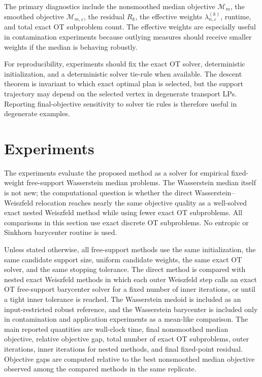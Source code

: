 \documentclass[pdflatex,sn-mathphys-ay]{sn-jnl}%
\theoremstyle{thmstyleone}%
\theoremstyle{thmstyletwo}%
\theoremstyle{thmstylethree}%
\newcommand{\calM}{\mathcal M}
\newcommand{\eps}{\varepsilon}
\begin{document}
The primary diagnostics include the nonsmoothed median objective \(\calM_m\), the smoothed objective \(\calM_{m,\eps}\), the residual \(R_k\), the effective weights \(\lambda_{n,\eps}^{(k)}\), runtime, and total exact OT subproblem count. The effective weights are especially useful in contamination experiments because outlying measures should receive smaller weights if the median is behaving robustly.

For reproducibility, experiments should fix the exact OT solver, deterministic initialization, and a deterministic solver tie-rule when available. The descent theorem is invariant to which exact optimal plan is selected, but the support trajectory may depend on the selected vertex in degenerate transport LPs. Reporting final-objective sensitivity to solver tie rules is therefore useful in degenerate examples.



\section{Experiments}\label{sec:experiments}

The experiments evaluate the proposed method as a solver for empirical fixed-weight free-support Wasserstein median problems. The Wasserstein median itself is not new; the computational question is whether the direct Wasserstein--Weiszfeld relocation reaches nearly the same objective quality as a well-solved exact nested Weiszfeld method while using fewer exact OT subproblems. All comparisons in this section use exact discrete OT subproblems. No entropic or Sinkhorn barycenter routine is used.

Unless stated otherwise, all free-support methods use the same initialization, the same candidate support size, uniform candidate weights, the same exact OT solver, and the same stopping tolerance. The direct method is compared with nested exact Weiszfeld methods in which each outer Weiszfeld step calls an exact OT free-support barycenter solver for a fixed number of inner iterations, or until a tight inner tolerance is reached. The Wasserstein medoid is included as an input-restricted robust reference, and the Wasserstein barycenter is included only in contamination and application experiments as a mean-like comparison. The main reported quantities are wall-clock time, final nonsmoothed median objective, relative objective gap, total number of exact OT subproblems, outer iterations, inner iterations for nested methods, and final fixed-point residual. Objective gaps are computed relative to the best nonsmoothed median objective observed among the compared methods in the same replicate.
\end{document}
